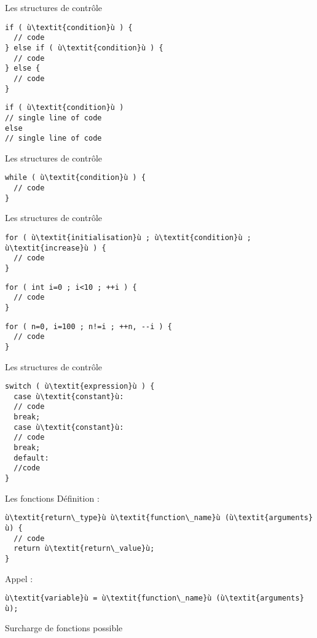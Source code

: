 \begin{frame}[fragile]{Les structures de contrôle}
  \begin{lstlisting}[escapechar=ù]
if ( ù\textit{condition}ù ) {
  // code
} else if ( ù\textit{condition}ù ) {
  // code
} else {
  // code
}
  \end{lstlisting}

  \begin{lstlisting}[escapechar=ù]
if ( ù\textit{condition}ù )
// single line of code
else
// single line of code
  \end{lstlisting}
\end{frame}

\begin{frame}[fragile]{Les structures de contrôle}
  \begin{lstlisting}[escapechar=ù]
while ( ù\textit{condition}ù ) {
  // code
}
  \end{lstlisting}
\end{frame}

\begin{frame}[fragile]{Les structures de contrôle}
  \begin{lstlisting}[escapechar=ù]
for ( ù\textit{initialisation}ù ; ù\textit{condition}ù ; ù\textit{increase}ù ) {
  // code
}
  \end{lstlisting}

  \begin{lstlisting}
for ( int i=0 ; i<10 ; ++i ) {
  // code
}
  \end{lstlisting}
  \begin{lstlisting}
for ( n=0, i=100 ; n!=i ; ++n, --i ) {
  // code
}
  \end{lstlisting}
\end{frame}

\begin{frame}[fragile]{Les structures de contrôle}
  \begin{lstlisting}[escapechar=ù]
switch ( ù\textit{expression}ù ) {
  case ù\textit{constant}ù:
  // code
  break;
  case ù\textit{constant}ù:
  // code
  break;
  default:
  //code
}
  \end{lstlisting}
\end{frame}

\begin{frame}[fragile]{Les fonctions}
  Définition :
  \begin{lstlisting}[escapechar=ù]
ù\textit{return\_type}ù ù\textit{function\_name}ù (ù\textit{arguments}ù) {
  // code
  return ù\textit{return\_value}ù;
}
  \end{lstlisting}

  Appel :
  \begin{lstlisting}[escapechar=ù]
ù\textit{variable}ù = ù\textit{function\_name}ù (ù\textit{arguments}ù);
  \end{lstlisting}

  Surcharge de fonctions possible
\end{frame}

